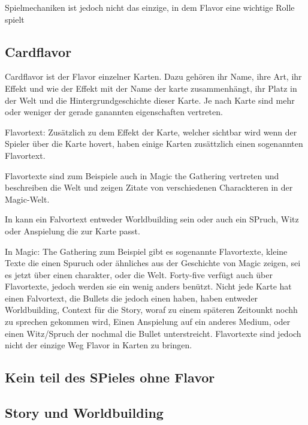 Spielmechaniken ist jedoch nicht das einzige, in dem Flavor eine wichtige Rolle spielt

%
%

\subsection{Cardflavor}\label{subsec:flavour-durch-mechaniken}

Cardflavor ist der Flavor einzelner Karten.
Dazu gehören ihr Name, ihre Art, ihr Effekt und wie der Effekt mit der Name der karte zusammenhängt,
ihr Platz in der Welt und die Hintergrundgeschichte dieser Karte. Je nach Karte sind mehr oder weniger der gerade ganannten
eigenschaften vertreten.

Flavortext:
Zusätzlich zu dem Effekt der Karte, welcher sichtbar wird wenn der Spieler über die Karte hovert, haben einige Karten zusättzlich einen sogenannten Flavortext.

Flavortexte sind zum Beispiele auch in Magic the Gathering vertreten und beschreiben die Welt und zeigen Zitate von verschiedenen Charackteren in der Magic-Welt.\cite{magicarena} \cite{soulOfTheGame}%

In \FF kann ein Falvortext entweder Worldbuilding sein oder auch ein SPruch, Witz oder Anspielung die zur Karte passt.








In Magic: The Gathering zum Beispiel
gibt es sogenannte Flavortexte, kleine Texte die einen Spuruch oder ähnliches aus der Geschichte von Magic zeigen, sei es jetzt über einen charakter, oder die Welt.
Forty-five verfügt auch über Flavortexte, jedoch werden sie ein wenig anders benützt. Nicht jede Karte hat einen Falvortext,  die Bullets die jedoch einen haben, haben entweder Worldbuilding,
Context für die Story, woraf zu einem späteren Zeitounkt nochh zu sprechen gekommen wird, Einen Anspielung auf ein anderes Medium, oder einen Witz/Spruch der nochmal
die Bullet unterstreicht. Flavortexte sind jedoch nicht der einzige Weg Flavor in Karten zu bringen.


\subsection{Kein teil des SPieles ohne Flavor}\label{subsec:flavour-durch-mechaniken}

\subsection{Story und Worldbuilding}\label{subsec:flavour-durch-mechaniken}


\renewcommand{\kapitelautor}{}
